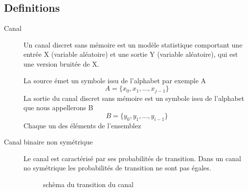 \documentclass{report}
\begin{document}
\subsection{Definitions}
\label{definitions}
\begin{description}
\item[Canal]
Un canal discret sans mémoire est un modèle
statistique comportant une entrée X (variable aléatoire) et une sortie Y
(variable aléatoire), qui est une version bruitée de X.

La source émet un symbole issu de l'alphabet par exemple A
\begin{equation}\label{key}
A=\{x_0,x_1,...,x_{j-1}\}
\end{equation}
La sortie du canal discret sans mémoire est un symbole issu de l'alphabet
que nous appellerons B
\begin{equation}\label{key}
B=\{y_0,y_1,...,y_{i-1}\}
\end{equation}
Chaque un des éléments de l'ensemblez
\item[Canal binaire non symétrique]
Le canal est caractérisé par ses probabilités de transition. Dans un canal no symétrique 
les probabilités de transition ne sont pas égales.


\begin{figure}[h]
	\centering
	\label{img:schema_transition}
	\caption{schèma du transition du canal}
\end{figure}


\end{description}
\end{document}
